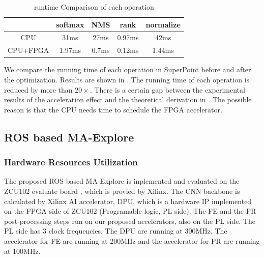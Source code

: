 \begin{table}[t]
  \centering
  \caption{runtime Comparison of each operation}
\begin{tabular}{|c|c|c|c|c|}
  \hline
             &    softmax &        NMS &       rank &  normalize \bigstrut\\
  \hline
         CPU &       31ms &       27ms &       0.97ms &       42ms \bigstrut\\
  \hline
    CPU+FPGA &     1.97ms &      0.7ms &     0.12ms &     1.44ms \bigstrut\\
  \hline
  \end{tabular}  
  
  \label{tab:optimization}%
\end{table}%

We compare the running time of each operation in SuperPoint before and after the optimization. Results are shown in . The running time of each operation is reduced by more than $20\times$. There is a certain gap between the experimental results of the acceleration effect and the theoretical derivation in . The possible reason is that the CPU needs time to schedule the FPGA accelerator.

\subsection{ ROS based MA-Explore }

\subsubsection { Hardware Resources Utilization }

The proposed ROS based MA-Explore is inplemented and evaluated on the ZCU102 evaluate board \cite{zcu102}, which is provied by Xilinx. The CNN backbone is calculated by Xilinx AI accelerator, DPU\cite{dpu}, which is a hardware IP implemented on the FPGA side of ZCU102 (Programable logic, PL side). The FE and the PR post-processing steps run on our proposed accelerators, also on the PL side. The PL side has 3 clock frequencies. The DPU are running at 300MHz. The accelerator for FE are running at 200MHz and the accelerator for PR are running at 100MHz.

